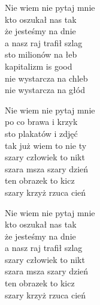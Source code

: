 \begin{text}
    Nie wiem nie pytaj mnie\\
    kto oszukał nas tak\\
    że jesteśmy na dnie\\
    a nasz raj trafił szlag\\
    sto milionów na łeb\\
    kapitalizm is good\\
    nie wystarcza na chleb\\
    nie wystarcza na głód

    Nie wiem nie pytaj mnie\\
    po co brawa i krzyk\\
    sto plakatów i zdjęć\\
    tak już wiem to nie ty\\
    szary człowiek to nikt\\
    szara msza szary dzień\\
    ten obrazek to kicz\\
    szary krzyż rzuca cień

    Nie wiem nie pytaj mnie\\
    kto oszukał nas tak\\
    że jesteśmy na dnie\\
    a nasz raj trafił szlag\\
    szary człowiek to nikt\\
    szara msza szary dzień\\
    ten obrazek to kicz\\
    szary krzyż rzuca cień
\end{text}
\begin{chord}

\end{chord}